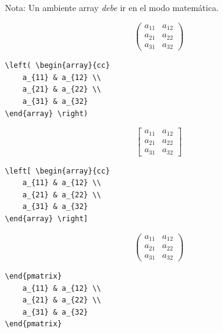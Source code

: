 \documentclass[../notes.tex]{subfiles}
\begin{document}
    Nota: Un ambiente array \emph{debe} ir en el modo matemática.

                \[ \left(
                    \begin{array}{ccc}
                        a_{11} & a_{12} \\
                        a_{21} & a_{22} \\  
                        a_{31} & a_{32}
                    \end{array}
                    \right)
                \] 
\begin{verbatim}
\left( \begin{array}{cc}
    a_{11} & a_{12} \\
    a_{21} & a_{22} \\  
    a_{31} & a_{32}
\end{array} \right)
\end{verbatim}
                
                \[ \left[
                    \begin{array}{ccc}
                        a_{11} & a_{12} \\
                        a_{21} & a_{22} \\  
                        a_{31} & a_{32}
                    \end{array}
                    \right]
                \] 
\begin{verbatim}
\left[ \begin{array}{cc}
    a_{11} & a_{12} \\
    a_{21} & a_{22} \\  
    a_{31} & a_{32}
\end{array} \right]
\end{verbatim}

                \[ \begin{pmatrix}
                        a_{11} & a_{12} \\
                        a_{21} & a_{22} \\  
                        a_{31} & a_{32}
                    \end{pmatrix}
                \] 
\begin{verbatim}
\end{pmatrix}
    a_{11} & a_{12} \\
    a_{21} & a_{22} \\  
    a_{31} & a_{32}
\end{pmatrix}
\end{verbatim}
                
\end{document}
